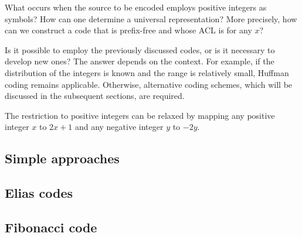 \documentclass{subfiles}
\begin{document}
\label{Sec:4}
    What occurs when the source to be encoded employs positive integers as 
    symbols? How can one determine a universal representation? More precisely, 
    how can we construct a code that is prefix-free and whose ACL is 
     for any \(x\)?

    Is it possible to employ the previously discussed codes, or is it necessary 
    to develop new ones? The answer depends on the context. For example, if 
    the distribution of the integers is known and the range is relatively small, 
    Huffman coding remains applicable. Otherwise, alternative coding schemes, 
    which will be discussed in the subsequent sections, are required.

    \begin{remark*}
        The restriction to positive integers can be relaxed by mapping any 
        positive integer \(x\) to \(2x + 1\) and any negative integer \(y\) 
        to \(-2y\).
    \end{remark*}

    \subsection{Simple approaches}
    

    \subsection{Elias codes}
    

    \subsection{Fibonacci code}
    
    
    \cleardoublepage
\end{document}
